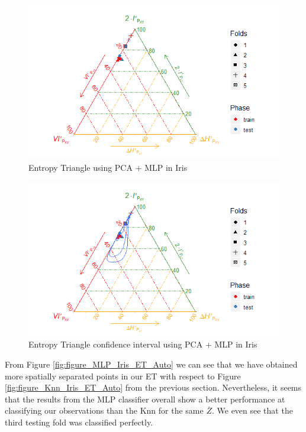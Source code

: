 \begin{figure}[H]
	
	\includegraphics[width=\linewidth]{Figuras_tfg/ET_Iris_Pca_Mlp}
	\caption{Entropy Triangle using PCA + MLP in Iris}
	\label{fig:figure_MLP_Iris_ET_PCA}
\end{figure}

\begin{figure}[H]
	
	\includegraphics[width=\linewidth]{Figuras_tfg/ET_Iris_Pca_Mlp_Confidence}
	\caption{Entropy Triangle confidence interval using PCA + MLP in Iris}
	\label{fig:figure_MLP_Iris_ET_PCA_Confidence}
\end{figure}

From Figure \ref{fig:figure_MLP_Iris_ET_Auto} we can see that we have obtained more spatially separated points in our ET with respect to Figure \ref{fig:figure_Knn_Iris_ET_Auto} from the previous section. Nevertheless, it seems that the results from the MLP classifier overall show a better performance at classifying our observations than the Knn for the same $\overline{Z}$. We even see that the third testing fold was classified perfectly.

